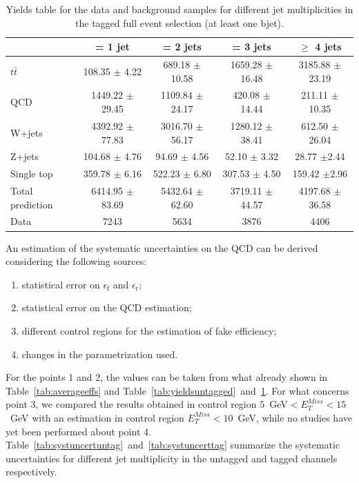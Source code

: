 \begin{table}\centering
\begin{tabular}{l c c c c}
\toprule
 & = 1 jet & = 2 jets & = 3 jets & $\ge$ 4 jets \\
\midrule
$t\bar{t}$& 108.35 $\pm$  4.22 &689.18 $\pm$  10.58 &1659.28 $\pm$  16.48 &3185.88 $\pm$23.19\\
QCD & 1449.22 $\pm$  29.45 &1109.84 $\pm$  24.17 &420.08 $\pm$  14.44 &211.11 $\pm$10.35\\
W+jets& 4392.92 $\pm$  77.83 &3016.70 $\pm$  56.17 &1280.12 $\pm$  38.41 &612.50 $\pm$26.04\\
Z+jets& 104.68 $\pm$  4.76 &94.69 $\pm$  4.56 &52.10 $\pm$  3.32 &28.77 $\pm$2.44\\
Single top& 359.78 $\pm$  6.16 &522.23 $\pm$  6.80 &307.53 $\pm$  4.50 &159.42 $\pm$2.96\\
\midrule
Total prediction & 6414.95 $\pm$83.69 & 5432.64 $\pm$62.60 & 3719.11 $\pm$44.57 & 4197.68 $\pm$36.58 \\
Data& 7243 &5634 &3876 &4406\\
\bottomrule
\end{tabular}\caption{Yields table for the data and background samples for different jet multiplicities in the tagged full event selection (at least one bjet).}\label{tab:yieldstagged}
\end{table} 


An estimation of the systematic uncertainties on the QCD can be derived considering the following sources:
\begin{enumerate}
 \item statistical error on  $\epsilon_\mathrm{f}$ and  $\epsilon_\mathrm{r}$;
\item statistical error on the QCD estimation;
\item different control regions for the estimation of fake efficiency;
\item changes in the parametrization used.
\end{enumerate} For the points 1 and 2, the values can be taken from what already shown in Table~\ref{tab:averageeffs} and Table~\ref{tab:yieldsuntagged}~and~\ref{tab:yieldstagged}. For what concerns point 3, we compared the results obtained in control region $5$~GeV$< E^{Miss}_T<15$~GeV with an estimation in control region $ E^{Miss}_T<10$~GeV, while no studies have yet been performed about point 4. Table~\ref{tab:systuncertuntag}~and~\ref{tab:systuncerttag} summarize the systematic uncertainties for different jet multiplicity in the untagged and tagged channels respectively.


